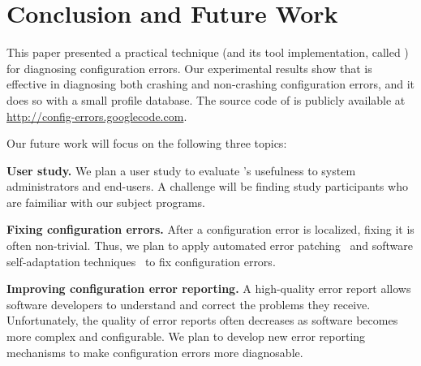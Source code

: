\section{Conclusion and Future Work}
\vspace{-1mm}

This paper presented a practical technique (and
its tool implementation, called \ourtool) for diagnosing
configuration errors.
Our experimental results show that \ourtool is effective in
diagnosing both crashing and non-crashing configuration errors,
and it does so with a small profile database.
The source code of \ourtool is publicly available at
\url{http://config-errors.googlecode.com}.

\vspace{1mm}

Our future
work will focus on the following three topics:

\textbf{User study.} We plan a user study to evaluate
\ourtool's usefulness to system administrators and
end-users. A challenge will be finding study participants
who are faimiliar with our subject programs.

\textbf{Fixing configuration errors.} After a configuration error
is localized, fixing it is
often non-trivial. Thus, we
plan to apply automated error patching~\cite{rangefix} and
software self-adaptation techniques~\cite{Wang:2009:STR} to
fix configuration errors.


\textbf{Improving configuration error reporting.} A high-quality
error report allows software developers to understand and correct the problems
they receive. 
Unfortunately, the quality of error reports often
decreases as software becomes more complex and configurable.
We plan to develop new error reporting mechanisms
to make configuration errors
more diagnosable.

